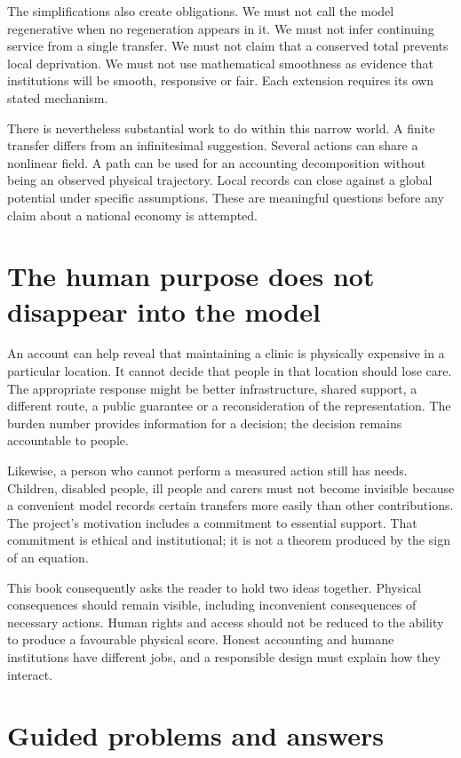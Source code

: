 The simplifications also create obligations. We must not call the model regenerative when no regeneration appears in it. We must not infer continuing service from a single transfer. We must not claim that a conserved total prevents local deprivation. We must not use mathematical smoothness as evidence that institutions will be smooth, responsive or fair. Each extension requires its own stated mechanism.

There is nevertheless substantial work to do within this narrow world. A finite transfer differs from an infinitesimal suggestion. Several actions can share a nonlinear field. A path can be used for an accounting decomposition without being an observed physical trajectory. Local records can close against a global potential under specific assumptions. These are meaningful questions before any claim about a national economy is attempted.

\section{The human purpose does not disappear into the model}
An account can help reveal that maintaining a clinic is physically expensive in a particular location. It cannot decide that people in that location should lose care. The appropriate response might be better infrastructure, shared support, a different route, a public guarantee or a reconsideration of the representation. The burden number provides information for a decision; the decision remains accountable to people.

Likewise, a person who cannot perform a measured action still has needs. Children, disabled people, ill people and carers must not become invisible because a convenient model records certain transfers more easily than other contributions. The project's motivation includes a commitment to essential support. That commitment is ethical and institutional; it is not a theorem produced by the sign of an equation.

This book consequently asks the reader to hold two ideas together. Physical consequences should remain visible, including inconvenient consequences of necessary actions. Human rights and access should not be reduced to the ability to produce a favourable physical score. Honest accounting and humane institutions have different jobs, and a responsible design must explain how they interact.

\section{Guided problems and answers}
